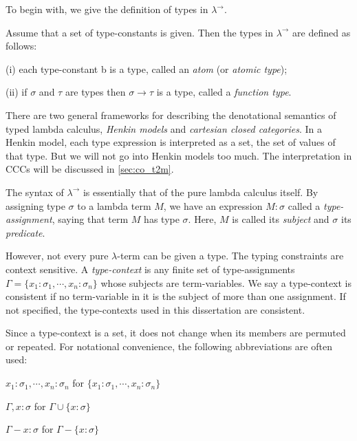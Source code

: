 To begin with, we give the definition of types in $ \lambda ^\to $.
\begin{definition}
Assume that a set of type-constants is given. Then the types in $ \lambda ^\to $ are defined as follows:
\begin{myitemize}
\item[(i)] each type-constant b is a type, called an \emph{atom} (or \emph{atomic type});
\item[(ii)] if $ \sigma $ and $ \tau $ are types then $ \sigma \to \tau $ is a type, called a \emph{function type}.
\end{myitemize}
\end{definition}

There are two general frameworks for describing the denotational semantics of typed lambda calculus, \emph{Henkin models} and \emph{cartesian closed categories}. In a Henkin model, each type expression is interpreted as a set, the set of values of that type. But we will not go into Henkin models too much. The interpretation in CCCs will be discussed in \ref{sec:co_t2m}.

The syntax of $ \lambda ^\to $ is essentially that of the pure lambda calculus itself. By assigning type $ \sigma $ to a lambda term $ M $, we have an expression $ M:\sigma $ called a \emph{type-assignment}, saying that term $ M $ has type $ \sigma $. Here, $ M $ is called its \emph{subject} and $ \sigma $ its \emph{predicate}.

However, not every pure $ \lambda $-term can be given a type. The typing constraints are context sensitive. A \emph{type-context} is any finite set of type-assignments $ \Gamma = \{ x_1 : \sigma _1 , \cdots , x_n : \sigma _n \} $ whose subjects are term-variables. We say a type-context is consistent if no term-variable in it is the subject of more than one assignment. If not specified, the type-contexts used in this dissertation are consistent.

Since a type-context is a set, it does not change when its members are permuted or repeated. For notational convenience, the following abbreviations are often used:
\begin{myitemize}
\item $x_1 : \sigma _1 , \cdots , x_n : \sigma _n $ for $ \{ x_1 : \sigma _1 , \cdots , x_n : \sigma _n \} $
\item $ \Gamma , x : \sigma $ for $ \Gamma \cup \{ x : \sigma \} $
\item $ \Gamma - x : \sigma $ for $ \Gamma - \{ x : \sigma \} $
\end{myitemize}

